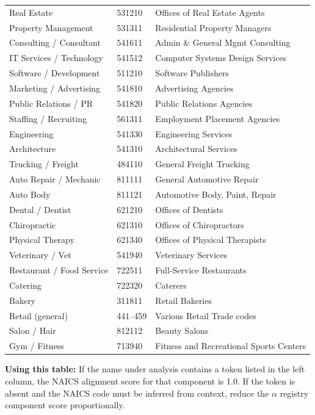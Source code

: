 \documentclass[12pt, openany]{book}
\theoremstyle{thmstyle}
\theoremstyle{defstyle}
\begin{document}
\begin{longtable}{p{1.4in}p{0.9in}p{3.2in}}
Real Estate & 531210 & Offices of Real Estate Agents \\
Property Management & 531311 & Residential Property Managers \\
Consulting / Consultant & 541611 & Admin \& General Mgmt Consulting \\
IT Services / Technology & 541512 & Computer Systems Design Services \\
Software / Development & 511210 & Software Publishers \\
Marketing / Advertising & 541810 & Advertising Agencies \\
Public Relations / PR & 541820 & Public Relations Agencies \\
Staffing / Recruiting & 561311 & Employment Placement Agencies \\
Engineering & 541330 & Engineering Services \\
Architecture & 541310 & Architectural Services \\
Trucking / Freight & 484110 & General Freight Trucking \\
Auto Repair / Mechanic & 811111 & General Automotive Repair \\
Auto Body & 811121 & Automotive Body, Paint, Repair \\
Dental / Dentist & 621210 & Offices of Dentists \\
Chiropractic & 621310 & Offices of Chiropractors \\
Physical Therapy & 621340 & Offices of Physical Therapists \\
Veterinary / Vet & 541940 & Veterinary Services \\
Restaurant / Food Service & 722511 & Full-Service Restaurants \\
Catering & 722320 & Caterers \\
Bakery & 311811 & Retail Bakeries \\
Retail (general) & 441--459 & Various Retail Trade codes \\
Salon / Hair & 812112 & Beauty Salons \\
Gym / Fitness & 713940 & Fitness and Recreational Sports Centers \\
\end{longtable}

\textbf{Using this table:} If the name under analysis contains a token listed in the left column, the NAICS alignment score for that component is 1.0. If the token is absent and the NAICS code must be inferred from context, reduce the $\alpha$ registry component score proportionally.
\end{document}
